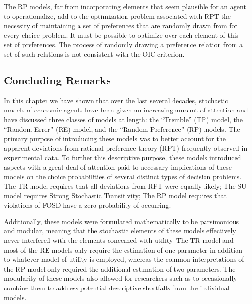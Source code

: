 The RP models, far from incorporating elements that seem plausible for an agent to operationalize, add to the optimization problem associated with RPT the necessity of maintaining a set of preferences that are randomly drawn from for every choice problem.
It must be possible to optimize over each element of this set of preferences.
The process of randomly drawing a preference relation from a set of such relations is not consistent with the OIC criterion.

\subsection{Concluding Remarks}

In this chapter we have shown that over the last several decades, stochastic models of economic agents have been given an increasing amount of attention and have discussed three classes of models at length: the \enquote{Tremble} (TR) model, the \enquote{Random Error} (RE) model, and the \enquote{Random Preference} (RP) models.
The primary purpose of introducing these models was to better account for the apparent deviations from rational preference theory (RPT) frequently observed in experimental data.
To further this descriptive purpose, these models introduced aspects with a great deal of attention paid to necessary implications of these models on the choice probabilities of several distinct types of decision problems.
The TR model requires that all deviations from RPT were equally likely;
The SU model requires Strong Stochastic Transitivity;
The RP model requires that violations of FOSD have a zero probability of occurring.

Additionally, these models were formulated mathematically to be parsimonious and modular, meaning that the stochastic elements of these models effectively never interfered with the elements concerned with utility.
The TR model and most of the RE models only require the estimation of one parameter in addition to whatever model of utility is employed, whereas the common interpretations of the RP model only required the additional estimation of two parameters.
The modularity of these models also allowed for researchers such as \textcite{Loomes2002} to occasionally combine them to address potential descriptive shortfalls from the individual models.

